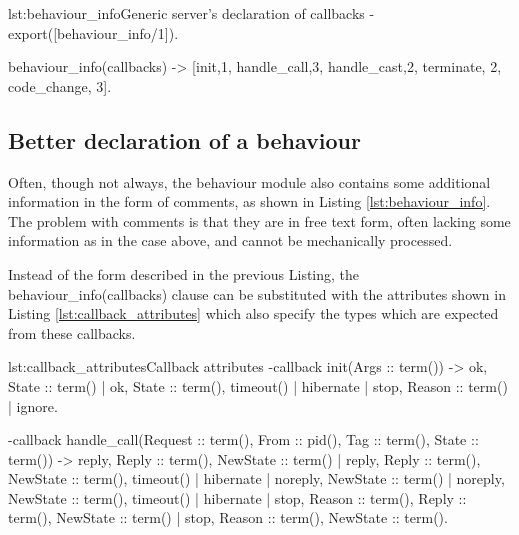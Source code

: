 \begin{console}{lst:behaviour_info}{Generic server's declaration of callbacks}
-export([behaviour_info/1]).

behaviour_info(callbacks) ->
  [{init,1}, {handle_call,3}, {handle_cast,2},
   {terminate, 2}, {code_change, 3}].


\end{console}

\subsection{Better declaration of a behaviour}

Often, though not always, the behaviour module also contains some
additional information in the form of comments, as shown in Listing
\ref{lst:behaviour_info}. The problem with comments is that they are
in free text form, often lacking some information as in the case
above, and cannot be mechanically processed.

Instead of the form described in the previous Listing, the
behaviour\_info(callbacks) clause can be substituted with the
attributes shown in Listing \ref{lst:callback_attributes} which also
specify the types which are expected from these callbacks.

\begin{console}{lst:callback_attributes}{Callback attributes}
-callback init(Args :: term()) ->
    {ok, State :: term()} |
    {ok, State :: term(), timeout() | hibernate} |
    {stop, Reason :: term()} | 
    ignore.

-callback handle_call(Request :: term(), From :: {pid(), Tag :: term()},
                      State :: term()) ->
    {reply, Reply :: term(), NewState :: term()} |
    {reply, Reply :: term(), NewState :: term(), timeout() | hibernate} |
    {noreply, NewState :: term()} |
    {noreply, NewState :: term(), timeout() | hibernate} |
    {stop, Reason :: term(), Reply :: term(), NewState :: term()} |
    {stop, Reason :: term(), NewState :: term()}.


\end{console}

